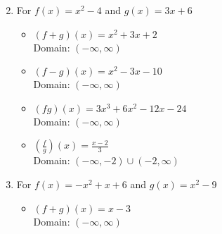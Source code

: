 \begin{enumerate}
\begin{multicols}{2}
\end{multicols}


\item For $f(x) = x^2-4$ and $g(x) = 3x+6$

\begin{multicols}{2}

\begin{itemize}

\item $(f+g)(x) = x^2+3x+2$ \\
      Domain: $(-\infty, \infty)$
      
      \vfill
      
      \columnbreak
      
\item $(f-g)(x) = x^2-3x-10$ \\
      Domain:  $(-\infty, \infty)$


\end{itemize}

\end{multicols}

\begin{multicols}{2}

\begin{itemize}

\item $(fg)(x) = 3x^3+6x^2-12x-24$ \\
      Domain: $(-\infty, \infty)$
      
      \vfill
      
      \columnbreak
      
\item $\left(\frac{f}{g}\right)(x) = \frac{x-2}{3}$ \\
      Domain:  $\left(-\infty, -2 \right) \cup \left(-2, \infty \right)$


\end{itemize}

\end{multicols}

\newpage

\item For $f(x) = -x^2+x+6$ and $g(x) = x^2-9$

\begin{multicols}{2}

\begin{itemize}

\item $(f+g)(x) = x-3$ \\
      Domain: $(-\infty, \infty)$
      

\end{itemize}
\end{multicols}
\end{enumerate}
